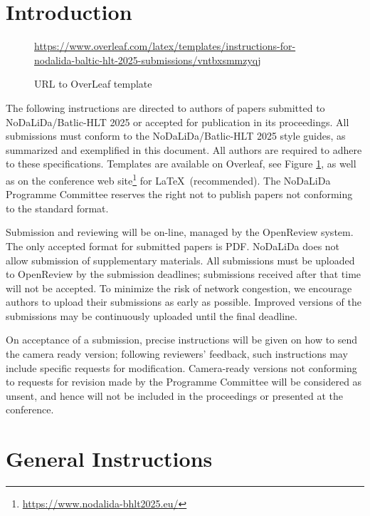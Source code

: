 \documentclass[11pt]{article}
\begin{document}
\section{Introduction}

\begin{figure}
    \centering
    \begin{scriptsize}
         \url{https://www.overleaf.com/latex/templates/instructions-for-nodalida-baltic-hlt-2025-submissions/vntbxsmmzyqj} \\
    \caption{URL to OverLeaf template}
    \label{fig:overleaflink}
    \end{scriptsize}
\end{figure}

The following instructions are directed to authors of papers submitted
to NoDaLiDa/Batlic-HLT 2025 or accepted for publication in its proceedings. 
All submissions must conform to the NoDaLiDa/Batlic-HLT 2025 style guides, as summarized
and exemplified in this document. All authors are required to adhere to these specifications. 
Templates are available on Overleaf, see Figure \ref{fig:overleaflink}, as well as on the conference web site\footnote{\url{https://www.nodalida-bhlt2025.eu/}} for \LaTeX\
(recommended). The NoDaLiDa Programme Committee reserves
the right not to publish papers not conforming to the standard format. 

Submission and reviewing will be on-line, managed by the OpenReview system.
The only accepted format for submitted papers is PDF.
NoDaLiDa does not allow submission of supplementary materials.
All submissions must be uploaded to OpenReview by the submission deadlines;
submissions received after that time will not be accepted.
To minimize the risk of network congestion, we encourage authors to upload
their submissions as early as possible. 
Improved versions of the submissions may be continuously uploaded until the
final deadline. 

On acceptance of a submission, precise instructions will be given on how to
send the camera ready version; following reviewers' feedback, such instructions
may include specific requests for modification.
Camera-ready versions not conforming to requests for revision made by the
Programme Committee will be considered as unsent, and hence will not be
included in the proceedings or presented at the conference.

\section{General Instructions}
\end{document}
